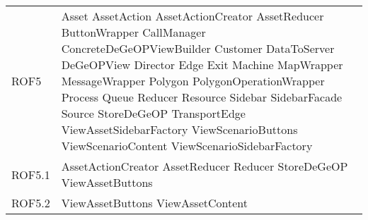 \begin{longtable}{p{2.5cm}!{\VRule[1pt]}p{5cm}}
		ROF5 & Asset \newline AssetAction \newline AssetActionCreator \newline AssetReducer \newline ButtonWrapper \newline CallManager \newline ConcreteDeGeOPViewBuilder \newline Customer \newline DataToServer \newline DeGeOPView \newline Director \newline Edge \newline Exit \newline Machine \newline MapWrapper \newline MessageWrapper \newline Polygon \newline PolygonOperationWrapper \newline Process \newline Queue \newline Reducer \newline Resource \newline Sidebar \newline SidebarFacade \newline Source \newline StoreDeGeOP \newline TransportEdge \newline ViewAssetSidebarFactory \newline ViewScenarioButtons \newline ViewScenarioContent \newline ViewScenarioSidebarFactory\\
		ROF5.1 & AssetActionCreator \newline AssetReducer \newline Reducer \newline StoreDeGeOP \newline ViewAssetButtons\\
		ROF5.2 & ViewAssetButtons \newline ViewAssetContent\\

\end{longtable}
